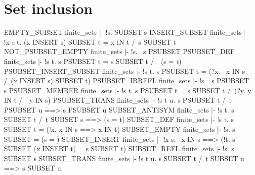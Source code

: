 \section{Set inclusion}
\THEOREM EMPTY\_SUBSET finite\_sets
|- !s. {} SUBSET s
\ENDTHEOREM
\THEOREM INSERT\_SUBSET finite\_sets
|- !x s t. (x INSERT s) SUBSET t = x IN t /\ s SUBSET t
\ENDTHEOREM
\THEOREM NOT\_PSUBSET\_EMPTY finite\_sets
|- !s. ~s PSUBSET {}
\ENDTHEOREM
\THEOREM PSUBSET\_DEF finite\_sets
|- !s t. s PSUBSET t = s SUBSET t /\ ~(s = t)
\ENDTHEOREM
\THEOREM PSUBSET\_INSERT\_SUBSET finite\_sets
|- !s t. s PSUBSET t = (?x. ~x IN s /\ (x INSERT s) SUBSET t)
\ENDTHEOREM
\THEOREM PSUBSET\_IRREFL finite\_sets
|- !s. ~s PSUBSET s
\ENDTHEOREM
\THEOREM PSUBSET\_MEMBER finite\_sets
|- !s t. s PSUBSET t = s SUBSET t /\ (?y. y IN t /\ ~y IN s)
\ENDTHEOREM
\THEOREM PSUBSET\_TRANS finite\_sets
|- !s t u. s PSUBSET t /\ t PSUBSET u ==> s PSUBSET u
\ENDTHEOREM
\THEOREM SUBSET\_ANTISYM finite\_sets
|- !s t. s SUBSET t /\ t SUBSET s ==> (s = t)
\ENDTHEOREM
\THEOREM SUBSET\_DEF finite\_sets
|- !s t. s SUBSET t = (!x. x IN s ==> x IN t)
\ENDTHEOREM
\THEOREM SUBSET\_EMPTY finite\_sets
|- !s. s SUBSET {} = (s = {})
\ENDTHEOREM
\THEOREM SUBSET\_INSERT finite\_sets
|- !x s. ~x IN s ==> (!t. s SUBSET (x INSERT t) = s SUBSET t)
\ENDTHEOREM
\THEOREM SUBSET\_REFL finite\_sets
|- !s. s SUBSET s
\ENDTHEOREM
\THEOREM SUBSET\_TRANS finite\_sets
|- !s t u. s SUBSET t /\ t SUBSET u ==> s SUBSET u
\ENDTHEOREM
